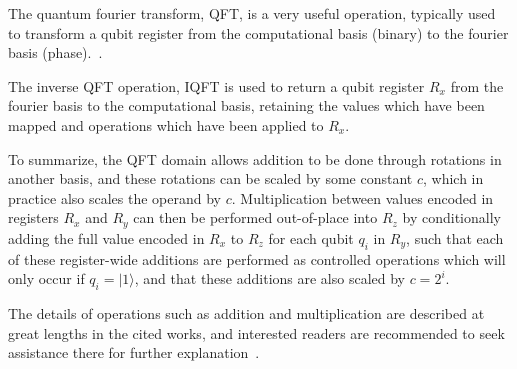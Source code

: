 \documentclass[twocolumn]{cinc}
\begin{document}
  The quantum fourier transform, QFT, is a very useful
  operation, typically used to transform a qubit register from the
  computational basis (binary) to the fourier basis (phase).~\cite{quantum_arithmetic}. 
  




  The inverse QFT operation, IQFT is used to return a qubit register $R_x$ from the fourier basis to the 
  computational basis, retaining the values which have been mapped and operations
  which have been applied to $R_x$.

  To summarize, the QFT domain allows addition to be done through rotations in another basis,
  and these rotations can be scaled by some constant $c$, which in practice also scales the 
  operand by $c$. Multiplication between values encoded in registers $R_x$ and $R_y$ can then be performed
  out-of-place into $R_z$ by conditionally adding the full value encoded in $R_x$ to $R_z$ for each qubit 
  $q_i$ in $R_y$, such that each of these register-wide additions are performed as controlled operations 
  which will only occur if $q_i=|1\rangle$, and that these additions are also scaled by $c=2^i$.

  The details of operations such as addition and multiplication are described at great
  lengths in the cited works, and interested readers are recommended to seek assistance
  there for further explanation~\cite{quantum_arithmetic}.
\end{document}
